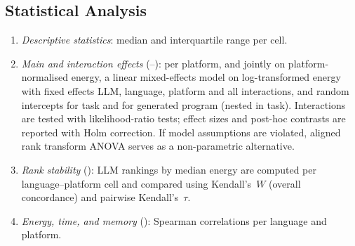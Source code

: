 \subsection{Statistical Analysis}
\begin{enumerate}[leftmargin=*]
  \item \emph{Descriptive statistics}: median and interquartile range per cell.
  \item \emph{Main and interaction effects} (--): per platform, and jointly on
        platform-normalised energy, a linear mixed-effects model on log-transformed energy
        with fixed effects LLM, language, platform and all interactions, and random
        intercepts for task and for generated program (nested in task). Interactions are
        tested with likelihood-ratio tests; effect sizes and post-hoc contrasts are
        reported with Holm correction. If model assumptions are violated, aligned rank
        transform ANOVA serves as a non-parametric alternative.
  \item \emph{Rank stability} (): LLM rankings by median energy are computed per
        language--platform cell and compared using Kendall's~$W$ (overall concordance) and
        pairwise Kendall's~$\tau$.
  \item \emph{Energy, time, and memory} (): Spearman correlations per language and
        platform.
\end{enumerate}

